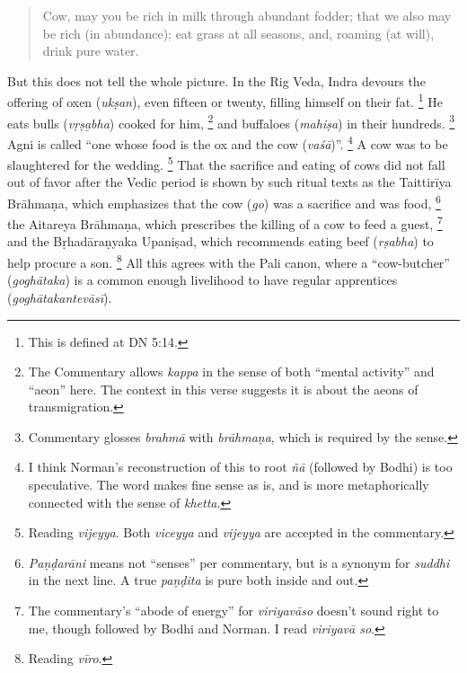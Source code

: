 \documentclass[12pt,openany]{book}%
\begin{document}
\begin{quotation}%
Cow, may you be rich in milk through abundant fodder; that we also may be rich (in abundance); eat grass at all seasons, and, roaming (at will), drink pure water.

%
\end{quotation}

But this does not tell the whole picture. In the Rig Veda, Indra devours the offering of oxen (\textit{\textsanskrit{ukṣan}}), even fifteen or twenty, filling himself on their fat. \footnote{This is defined at DN 5:14. } He eats bulls (\textit{\textsanskrit{vṛṣa}̱bha}) cooked for him, \footnote{The Commentary allows \textit{kappa} in the sense of both “mental activity” and “aeon” here. The context in this verse suggests it is about the aeons of transmigration. } and buffaloes (\textit{\textsanskrit{mahiṣa}}) in their hundreds. \footnote{Commentary glosses \textit{\textsanskrit{brahmā}} with \textit{\textsanskrit{brāhmaṇa}}, which is required by the sense. } Agni is called “one whose food is the ox and the cow (\textit{\textsanskrit{vaśā}})”. \footnote{I think Norman’s reconstruction of this to root \textit{\textsanskrit{ñā}} (followed by Bodhi) is too speculative. The word makes fine sense as is, and is more metaphorically connected with the sense of \textit{khetta}. } A cow was to be slaughtered for the wedding. \footnote{Reading \textit{vijeyya}. Both \textit{viceyya} and \textit{vijeyya} are accepted in the commentary. } That the sacrifice and eating of cows did not fall out of favor after the Vedic period is shown by such ritual texts as the \textsanskrit{Taittirīya} \textsanskrit{Brāhmaṇa}, which emphasizes that the cow (\textit{go}) was a sacrifice and was food, \footnote{\textit{\textsanskrit{Paṇḍarāni}} means not “senses” per commentary, but is a synonym for \textit{suddhi} in the next line. A true \textit{\textsanskrit{paṇḍita}} is pure both inside and out. } the Aitareya \textsanskrit{Brāhmaṇa}, which prescribes the killing of a cow to feed a guest, \footnote{The commentary’s “abode of energy” for \textit{\textsanskrit{viriyavāso}} doesn’t sound right to me, though followed by Bodhi and Norman. I read \textit{\textsanskrit{viriyavā} so}. } and the \textsanskrit{Bṛhadāraṇyaka} \textsanskrit{Upaniṣad}, which recommends eating beef (\textit{\textsanskrit{rṣabha}}) to help procure a son. \footnote{Reading \textit{\textsanskrit{vīro}}. } All this agrees with the Pali canon, where a “cow-butcher” (\textit{\textsanskrit{goghātaka}}) is a common enough livelihood to have regular apprentices (\textit{\textsanskrit{goghātakantevāsī}}).
\end{document}
